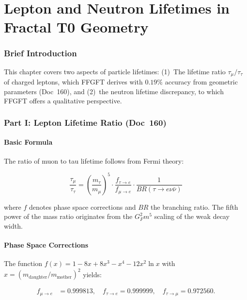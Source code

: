 \chapter{Lepton and Neutron Lifetimes in Fractal T0 Geometry}


	
	\subsection*{Brief Introduction}
	
	This chapter covers two aspects of particle lifetimes: (1)~The lifetime ratio \(\tau_\mu/\tau_\tau\) of charged leptons, which FFGFT derives with \(0.19\%\) accuracy from geometric parameters (Doc~160), and (2)~the neutron lifetime discrepancy, to which FFGFT offers a qualitative perspective.
	
	
	\subsection*{Part I: Lepton Lifetime Ratio (Doc~160)}
	
	\subsubsection*{Basic Formula}
	
	The ratio of muon to tau lifetime follows from Fermi theory:
	
	\begin{equation}
		\frac{\tau_\mu}{\tau_\tau} = \left(\frac{m_\tau}{m_\mu}\right)^5 \cdot \frac{f_{\tau \to e}}{f_{\mu \to e}} \cdot \frac{1}{BR(\tau \to e \nu \bar\nu)}
	\end{equation}
	
	where \(f\) denotes phase space corrections and \(BR\) the branching ratio. The fifth power of the mass ratio originates from the \(G_F^2 m^5\) scaling of the weak decay width.
	
	\subsubsection*{Phase Space Corrections}
	
	The function \(f(x) = 1 - 8x + 8x^3 - x^4 - 12x^2 \ln x\) with \(x = (m_\text{daughter}/m_\text{mother})^2\) yields:
	
	\begin{align}
		f_{\mu \to e} &= 0.999813, \quad f_{\tau \to e} = 0.999999, \quad f_{\tau \to \mu} = 0.972560.
	\end{align}
	
